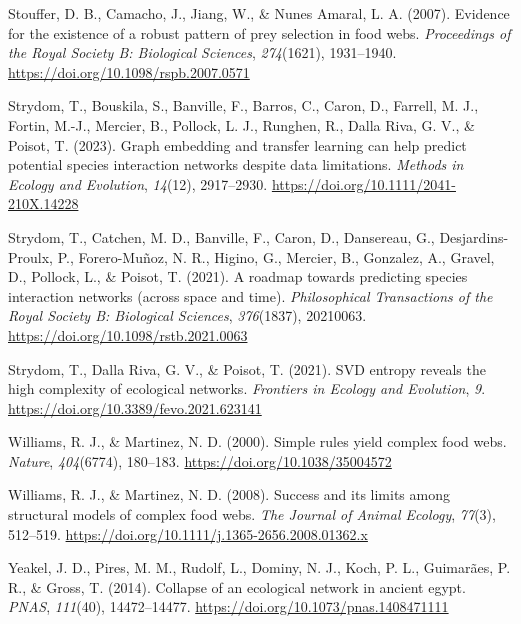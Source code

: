 \documentclass[
]{article}
\newlength{\cslhangindent}
\newenvironment{CSLReferences}[2] %
 {\begin{list}{}{%
  \setlength{\itemindent}{0pt}
  \setlength{\leftmargin}{0pt}
  \setlength{\parsep}{0pt}
  \ifodd #1
   \setlength{\leftmargin}{\cslhangindent}
   \setlength{\itemindent}{-1\cslhangindent}
  \fi
  \setlength{\itemsep}{#2\baselineskip}}}
 {\end{list}}
\begin{document}
\begin{CSLReferences}{1}{0}
Stouffer, D. B., Camacho, J., Jiang, W., \& Nunes Amaral, L. A. (2007).
Evidence for the existence of a robust pattern of prey selection in food
webs. \emph{Proceedings of the Royal Society B: Biological Sciences},
\emph{274}(1621), 1931--1940.
\url{https://doi.org/10.1098/rspb.2007.0571}

Strydom, T., Bouskila, S., Banville, F., Barros, C., Caron, D., Farrell,
M. J., Fortin, M.-J., Mercier, B., Pollock, L. J., Runghen, R., Dalla
Riva, G. V., \& Poisot, T. (2023). Graph embedding and transfer learning
can help predict potential species interaction networks despite data
limitations. \emph{Methods in Ecology and Evolution}, \emph{14}(12),
2917--2930. \url{https://doi.org/10.1111/2041-210X.14228}

Strydom, T., Catchen, M. D., Banville, F., Caron, D., Dansereau, G.,
Desjardins-Proulx, P., Forero-Muñoz, N. R., Higino, G., Mercier, B.,
Gonzalez, A., Gravel, D., Pollock, L., \& Poisot, T. (2021). A roadmap
towards predicting species interaction networks (across space and time).
\emph{Philosophical Transactions of the Royal Society B: Biological
Sciences}, \emph{376}(1837), 20210063.
\url{https://doi.org/10.1098/rstb.2021.0063}

Strydom, T., Dalla Riva, G. V., \& Poisot, T. (2021). SVD entropy
reveals the high complexity of ecological networks. \emph{Frontiers in
Ecology and Evolution}, \emph{9}.
\url{https://doi.org/10.3389/fevo.2021.623141}

Williams, R. J., \& Martinez, N. D. (2000). Simple rules yield complex
food webs. \emph{Nature}, \emph{404}(6774), 180--183.
\url{https://doi.org/10.1038/35004572}

Williams, R. J., \& Martinez, N. D. (2008). Success and its limits among
structural models of complex food webs. \emph{The Journal of Animal
Ecology}, \emph{77}(3), 512--519.
\url{https://doi.org/10.1111/j.1365-2656.2008.01362.x}

Yeakel, J. D., Pires, M. M., Rudolf, L., Dominy, N. J., Koch, P. L.,
Guimarães, P. R., \& Gross, T. (2014). Collapse of an ecological network
in ancient egypt. \emph{PNAS}, \emph{111}(40), 14472--14477.
\url{https://doi.org/10.1073/pnas.1408471111}

\end{CSLReferences}
\end{document}
